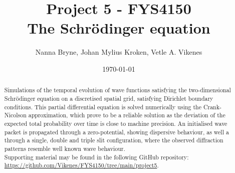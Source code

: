 



\title{Project 5 - FYS4150 \\
The Schrödinger equation
} 
\author{Nanna Bryne, Johan Mylius Kroken, Vetle A. Vikenes} 
\date{\today}                             
\noaffiliation                            

\begin{abstract}
    Simulations of the temporal evolution of wave functions satisfying the two-dimensional Schrödinger equation on a discretised spatial grid, satisfying Dirichlet boundary conditions. This partial differential equation is solved numerically using the Crank-Nicolson approximation, which prove to be a reliable solution as the deviation of the expected total probability over time is close to machine precision. An initialised wave packet is propagated through a zero-potential, showing dispersive behaviour, as well a through a single, double and triple slit configuration, where the observed diffraction patterns resemble well known wave behaviour. \\
    Supporting material may be found in the following GitHub repository: \url{https://github.com/Vikenes/FYS4150/tree/main/project5}. 
\end{abstract}
\maketitle






% 














